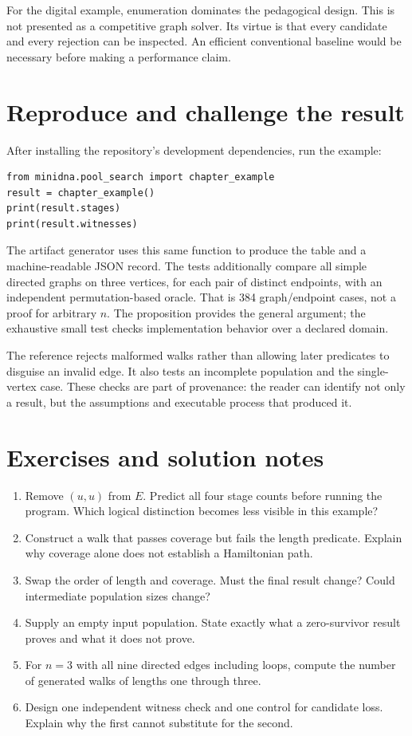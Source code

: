 For the digital example, enumeration dominates the pedagogical design. This
is not presented as a competitive graph solver. Its virtue is that every
candidate and every rejection can be inspected. An efficient conventional
baseline would be necessary before making a performance claim.

\section{Reproduce and challenge the result}
After installing the repository's development dependencies, run the example:
\begin{Verbatim}[fontsize=\small]
from minidna.pool_search import chapter_example
result = chapter_example()
print(result.stages)
print(result.witnesses)
\end{Verbatim}
The artifact generator uses this same function to produce the table and a
machine-readable JSON record. The tests additionally compare all simple
directed graphs on three vertices, for each pair of distinct endpoints, with
an independent permutation-based oracle. That is 384 graph/endpoint cases,
not a proof for arbitrary $n$. The proposition provides the general argument;
the exhaustive small test checks implementation behavior over a declared domain.

The reference rejects malformed walks rather than allowing later predicates
to disguise an invalid edge. It also tests an incomplete population and the
single-vertex case. These checks are part of \gls{provenance}: the reader can
identify not only a result, but the assumptions and executable process that
produced it.

\section{Exercises and solution notes}
\begin{enumerate}
\item Remove $(u,u)$ from $E$. Predict all four stage counts before running the
program. Which logical distinction becomes less visible in this example?
\item Construct a walk that passes coverage but fails the length predicate.
Explain why coverage alone does not establish a Hamiltonian path.
\item Swap the order of length and coverage. Must the final result change?
Could intermediate population sizes change?
\item Supply an empty input population. State exactly what a zero-survivor
result proves and what it does not prove.
\item For $n=3$ with all nine directed edges including loops, compute the
number of generated walks of lengths one through three.
\item Design one independent witness check and one control for candidate
loss. Explain why the first cannot substitute for the second.
\end{enumerate}

